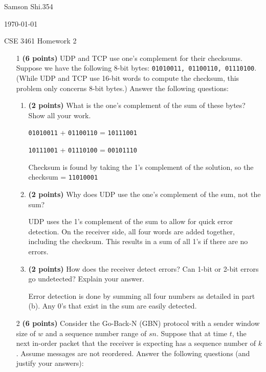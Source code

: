\documentclass{article}
\begin{document}
\begin{flushright}
Samson Shi.354

\today

CSE 3461 Homework 2
\end{flushright}

\begin{enumerate}

\item[1]\textbf{(6 points)} UDP and TCP use one’s complement for their checksums. Suppose we have the following 8-bit bytes: \texttt{01010011, 01100110, 01110100}. (While UDP and TCP use 16-bit words to compute the checksum, this problem only concerns 8-bit bytes.) Answer the following questions:

\begin{enumerate}
  \item \textbf{(2 points)} What is the one’s complement of the sum of these bytes? Show all your work.

  \texttt{01010011} + \texttt{01100110} = \texttt{10111001}

  \texttt{10111001} + \texttt{01110100} = \texttt{00101110}

  Checksum is found by taking the 1's complement of the solution, so the checksum = \texttt{11010001}

  \item \textbf{(2 points)} Why does UDP use the one’s complement of the sum, not the sum?

  UDP uses the 1's complement of the sum to allow for quick error detection. On the receiver side, all four words are added together, including the checksum. This results in a sum of all 1's if there are no errors.

  \item \textbf{(2 points)} How does the receiver detect errors? Can 1-bit or 2-bit errors go undetected? Explain your answer.

  Error detection is done by summing all four numbers as detailed in part (b). Any 0's that exist in the sum are easily detected. 

\end{enumerate}

\item[2]\textbf{(6 points)} Consider the Go-Back-N (GBN) protocol with a sender window size of $w$ and a sequence number range of $sn$. Suppose that at time $t$, the next in-order packet that the receiver is expecting has a sequence number of $k$. Assume messages are not reordered. Answer the following questions (and justify your answers):


\end{enumerate}
\end{document}
